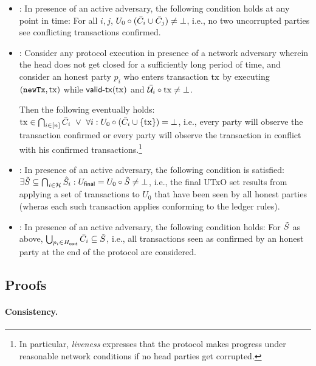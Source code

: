 \begin{itemize}
\item {}: In presence of an active adversary, the
  following condition holds at any point in time:
   For all $i,j$,
   $U_{0} \circ (\bar{C}_i \cup \bar{C}_j) \not= \bot$, i.e., no two
   uncorrupted parties see conflicting transactions confirmed.

  \item {}:
    Consider any protocol execution in presence of a network adversary wherein
    the head does not get closed for a sufficiently long period of time, and consider
    an honest party $p_i$ who enters transaction $\mathrm{tx}$ by executing $(\mathtt{newTx},\mathrm{tx})$
    while $\mathsf{valid\textsf{-}{}tx}(\mathrm{tx})$ and $\bar {\mathcal U}_i\circ\mathrm{tx}\not=\bot$.

    Then the following eventually holds:
    $\tx \in \bigcap_{i\in[n]} \Tbar_i\ \vee\ %
    \forall i: \Uinit \circ (\Tbar_i\cup\{\tx\}) = \bot$,
    i.e., every party will observe the transaction confirmed or every party
    will observe the transaction in conflict with his confirmed transactions.\footnote{
      In particular, \emph{liveness} expresses that the protocol makes progress
      under reasonable network conditions if no head parties get corrupted.
    }

\item {}: In presence of an active adversary,
  the following condition is satisfied:
  $\exists \tilde{S} \subseteq \bigcap_{i \in \mathcal H} \hat{S}_i : U_{\mathsf{final}}
  = U_{0} \circ \tilde{S}\not=\bot$, i.e., the final UTxO set results
  from applying a set of transactions to $U_0$ that have been seen by
  all honest parties (wheras each such transaction applies conforming to the ledger rules).
\item {}: In presence of an active adversary,
  the following condition holds: For $\tilde{S}$ as above,
  $\bigcup_{p_i \in H_{\mathsf{cont}}} \bar{C}_i \subseteq \tilde{S}$, i.e., all
  transactions seen as confirmed by an honest party at the end of the
  protocol are considered.
\end{itemize}

\subsection{Proofs}

\paragraph{Consistency.}

